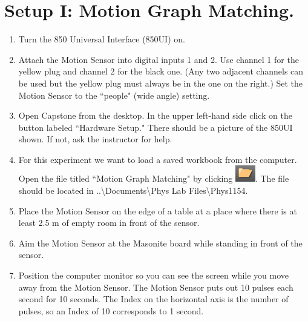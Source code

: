 \documentclass[main.tex]{subfiles}
\begin{document}
\section{Setup I: Motion Graph Matching.}
\begin{enumerate}
\item
Turn the 850 Universal Interface (850UI) on.
\item
Attach the Motion Sensor into digital inputs 1 and 2. Use channel 1 for the yellow plug and channel 2 for the black one. (Any two adjacent channels can be used but the yellow plug must always be in the one on the right.) Set the Motion Sensor to the ``people" (wide angle) setting.
\item
Open Capstone from the desktop. In the upper left-hand side click on the button labeled ``Hardware Setup."  There should be a picture of the 850UI shown. If not, ask the instructor for help.
\item
For this experiment we want to load a saved workbook from the computer. Open the file titled ``Motion Graph Matching" by clicking \includegraphics{Open_Experiment}. The file should be located in ..\textbackslash Documents\textbackslash Phys Lab Files\textbackslash Phys1154.
\item
Place the Motion Sensor on the edge of a table at a place where there is at least 2.5 m of empty room in front of the sensor.
\item
Aim the Motion Sensor at the Masonite board while standing in front of the sensor.
\item
Position the computer monitor so you can see the screen while you move away from the Motion Sensor.  The Motion Sensor puts out 10 pulses each second for 10 seconds.  The Index on the horizontal axis is the number of pulses, so an Index of 10 corresponds to 1 second.
\end{enumerate}
\end{document}
